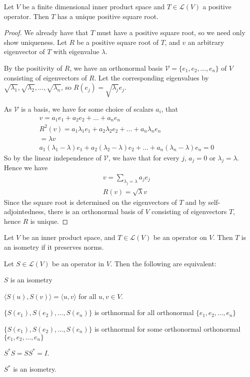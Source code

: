 \documentclass[]{article}
\begin{document}
\begin{thm}
		Let $V$ be a finite dimensional inner product space and $T \in \mathcal{L}(V)$ a positive operator. Then $T$ has a unique positive square root.
\end{thm}

\begin{proof}
		We already have that $T$ must have a positive square root, so we need only show uniqueness. Let $R$ be a positive square root of $T$, and $v$ an arbitrary eigenvector of $T$ with eigenvalue $\lambda$. 

		By the positivity of $R$, we have an orthonormal basis $\mathcal{V} = \{e_1, e_2, \ldots, e_n\}$ of $V$ consisting of eigenvectors of $R$. Let the corresponding eigenvalues by $\sqrt{\lambda_1}, \sqrt{\lambda_2}, \ldots, \sqrt{\lambda_n}$, so $R(e_j) = \sqrt{\lambda_j} e_j$.

		As $\mathcal{V}$ is a basis, we have for some choice of scalars $a_i$, that
		\begin{align*}
				v = a_1 e_1 + a_2 e_2 + \ldots + a_n e_n \\
				R^2(v) = a_1 \lambda_1 e_1 + a_2 \lambda_2 e_2 + \ldots + a_n \lambda_n e_n \\
				= \lambda v \\
				a_1 (\lambda_1 - \lambda) e_1 + a_2 (\lambda_2 - \lambda) e_2 + \ldots + a_n (\lambda_n - \lambda) e_n = 0
		\end{align*}
		So by the linear independence of $\mathcal{V}$, we have that for every $j$, $a_j = 0$ or $\lambda_j = \lambda$. Hence we have
		\begin{align*}
				v = \sum_{\lambda_j = \lambda} a_j e_j \\
				R(v) = \sqrt{\lambda} v
		\end{align*}
		Since the square root is determined on the eigenvectors of $T$ and by self-adjointedness, there is an orthonormal basis of $V$ consisting of eigenvectors $T$, hence $R$ is unique.
\end{proof}

\begin{defi} [Isometry]
		Let $V$ be an inner product space, and $T \in \mathcal{L}(V)$ be an operator on $V$. Then $T$ is an isometry if it preserves norms.
\end{defi}

\begin{thm}
		Let $S \in \mathcal{L}(V)$ be an operator in $V$. Then the following are equivalent:
		\begin{enumerate*}
		\item $S$ is an isometry
		\item $\langle S(u), S(v) \rangle = \langle u, v \rangle $ for all $u, v \in V$.
		\item $\{S(e_1), S(e_2), \ldots, S(e_n)\}$ is orthnormal for all orthonormal $\{e_1,e_2,\ldots,e_n\}$
		\item $\{S(e_1), S(e_2), \ldots, S(e_n)\}$ is orthnormal for some orthonormal orthonormal $\{e_1,e_2,\ldots,e_n\}$
		\item $S^*S = SS^* = I$.
		\item $S^*$ is an isometry.
		\end{enumerate*}
\end{thm}
\end{document}
